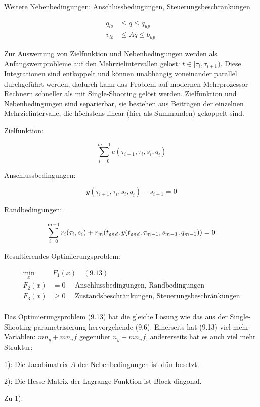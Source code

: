 Weitere Nebenbedingungen: Anschlussbedingungen, Steuerungsbeschränkungen

\begin{align*}
q_{lo} & \leq q \leq q_{up} \\
v_{lo} &\leq A q \leq b_{up} \
\end{align*}

Zur Auswertung von Zielfunktion und Nebenbedingungen werden als Anfangswertprobleme auf den Mehrzielintervallen gelöst: $t \in [\tau_i, \tau_{i+1} )$. Diese Integrationen sind entkoppelt und können unabhängig voneinander parallel durchgeführt werden, dadurch kann das Problem auf modernen Mehrprozessor-Rechnern schneller als mit Single-Shooting gelöst werden. Zielfunktion und Nebenbedingungen sind separierbar, sie bestehen aus Beiträgen der einzelnen Mehrzielintervalle, die höchstens linear (hier als Summanden) gekoppelt sind.

Zielfunktion:

\[ \sum\limits_{i=0}^{m-1} e(\tau_{i+1}, \tau_i, s_i, q_i) \]

Anschlussbedingungen:

\[ y(\tau_{i+1}, \tau_i, s_i, q_i) - s_{i+1} = 0 \]

Randbedingungen:

\[ \sum\limits_{i=0}^{m-1} r_i(\tau_i, s_i) + r_m({t_{end}}, y({t_{end}}, \tau_{m-1}, s_{m-1}, q_{m-1})) = 0 \]

Resultierendes Optimierungsproblem:

\begin{align*}
\min_x &F_1(x) \quad (9.13) \\
F_2(x) &= 0 \quad \text{ Anschlussbedingungen, Randbedingungen} \\
F_3(x) & \geq 0 \quad \text{ Zustandsbeschränkungen, Steuerungsbeschränkungen}\\
\end{align*}

Das Optimierungsproblem (9.13) hat die gleiche Lösung wie das aus der Single-Shooting-parametrisierung hervorgehende (9.6). Einerseits hat (9.13) viel mehr Variablen: $m n_y + m n_u f$ gegenüber $n_y + m n_u f$, andererseits hat es auch viel mehr Struktur:

\bitm
\item 1): Die Jacobimatrix $A$ der Nebenbedingungen ist dün besetzt.
\item 2): Die Hesse-Matrix der Lagrange-Funktion ist Block-diagonal.
\eitm

Zu 1):

